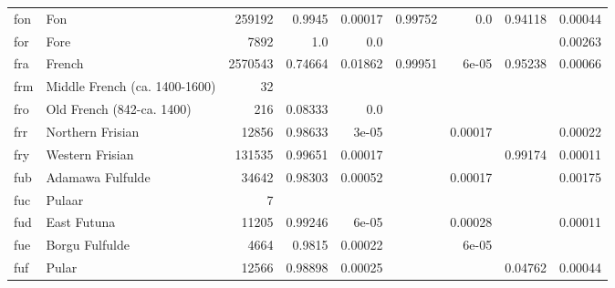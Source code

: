 \documentclass[11pt]{article}
\begin{document}
\begin{table*}[h]
{\begin{tabular}{llrrrrrrr}
fon         & Fon         & 259192         & 0.9945         & 0.00017         & 0.99752         & 0.0         & 0.94118         & 0.00044         \\

for         & Fore         & 7892         & 1.0         & 0.0         &          &          &          & 0.00263         \\

fra         & French         & 2570543         & 0.74664         & 0.01862         & 0.99951         & 6e-05         & 0.95238         & 0.00066         \\

frm         & Middle French (ca. 1400-1600)         & 32         &          &          &          &          &          &          \\

fro         & Old French (842-ca. 1400)         & 216         & 0.08333         & 0.0         &          &          &          &          \\

frr         & Northern Frisian         & 12856         & 0.98633         & 3e-05         &          & 0.00017         &          & 0.00022         \\

fry         & Western Frisian         & 131535         & 0.99651         & 0.00017         &          &          & 0.99174         & 0.00011         \\

fub         & Adamawa Fulfulde         & 34642         & 0.98303         & 0.00052         &          & 0.00017         &          & 0.00175         \\

fuc         & Pulaar         & 7         &          &          &          &          &          &          \\

fud         & East Futuna         & 11205         & 0.99246         & 6e-05         &          & 0.00028         &          & 0.00011         \\

fue         & Borgu Fulfulde         & 4664         & 0.9815         & 0.00022         &          & 6e-05         &          &          \\

fuf         & Pular         & 12566         & 0.98898         & 0.00025         &          &          & 0.04762         & 0.00044         \\


\end{tabular}}
\end{table*}
\end{document}
